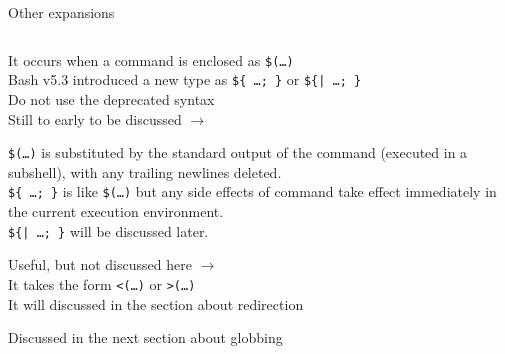\begin{frame}{Other expansions}
    \vspace{-8mm}
    \begin{columns}
        \begin{column}{\dimexpr\paperwidth-10mm}
            \begin{center}
                \large{}
            \end{center}
            \begin{description}
                \setlength{\itemsep}{3mm}
                \item[Command substitution:]
                    It occurs when a command is enclosed as \alert{\texttt{\$(\ldots)}}\\
                    Bash v5.3 introduced a new type as \alert{\texttt{\$\{ \ldots; \}}} or \alert{\texttt{\$\{| \ldots; \}}}\\
                    Do not use the deprecated syntax \\
                    Still to early to be discussed $\to$ \\[1mm]
                    {
                        \tiny
                        \alert{\texttt{\$(\ldots)}} is substituted by the standard output of the command (executed in a subshell), with any trailing newlines deleted.\\[1pt]
                        \alert{\texttt{\$\{ \ldots; \}}} is like \texttt{\$(\ldots)} but any side effects of command take effect immediately in the current execution environment.\\[1pt]
                        \alert{\texttt{\$\{| \ldots; \}}} will be discussed later.
                        \par
                    }
                \item[Process substitution:]
                    Useful, but not discussed here $\to$ \\
                    It takes the form \alert{\texttt{<(\ldots)}} or \alert{\texttt{>(\ldots)}}\\
                    It will discussed in the section about redirection
            \end{description}
            \begin{center}
                \large{}
            \end{center}
            \begin{description}%
                \item[Filename expansion:]
                    Discussed in the next section about globbing
            \end{description}
        \end{column}
    \end{columns}
\end{frame}
